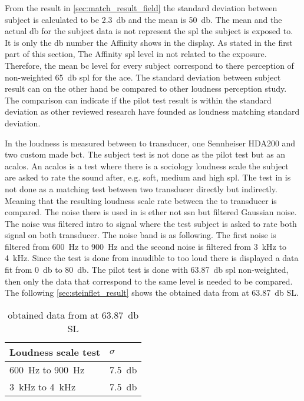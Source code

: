 From the result in \autoref{sec:match_result_field} the standard deviation between subject is calculated to be \SI{2.3}{\decibel} and the mean is \SI{50}{\decibel}. The mean and the actual \si{\decibel} for the subject data is not represent the \gls{spl} the subject is exposed to. It is only the \si{\decibel} number the Affinity shows in the display. As stated in the first part of this section, The Affinity  \gls{spl} level in not related to the exposure. Therefore, the mean \gls{bc} level for every subject correspond to there perception of non-weighted \SI{65}{\decibel} \gls{spl}  for the \gls{ace}. The standard deviation between subject result can on the other hand be compared to other loudness perception study. The comparison can indicate if the pilot test result is within the standard deviation as other reviewed research have founded as loudness matching standard deviation. 

In \citep{STENFELT201385} the loudness is measured between to transducer, one Sennheiser HDA200 and two custom made \gls{bct}. The subject test is not done as the pilot test but as an \gls{acalos}. An \gls{acalos} is a test where there is a sociology loudness scale the subject are asked to rate the sound after, e.g. soft, medium and high \gls{spl}. The test in \citep{STENFELT201385} is not done as a matching test between two transducer directly but indirectly. Meaning that the resulting loudness scale rate between the to transducer is compared. The noise there is used in \citep{STENFELT201385} is ether not \gls{ssn} but filtered Gaussian noise. The noise was filtered intro to signal where the test subject is asked to rate both signal on both transducer. The noise band is as following. The first noise is filtered from \SI{600}{\hertz} to \SI{900}{\hertz} and the second noise is filtered from \SI{3}{\kilo\hertz} to \SI{4}{\kilo\hertz}. Since the test is done from inaudible to too loud there is displayed a data fit from \SI{0}{\decibel} to \SI{80}{\decibel}. The pilot test is done with \SI{63.87}{\decibel} \gls{spl} non-weighted, then only the data that correspond to the same level is needed to be compared. The following \autoref{sec:steinflet_result} shows the obtained data from \citep{STENFELT201385} at \SI{63.87}{\decibel} SL.


\begin{table}[H]
\centering
\caption{obtained data from \citep{STENFELT201385} at \SI{63.87}{\decibel} SL}
\begin{tabular}{l|l}
Loudness scale test                        & $\sigma$            \\ \hline
\SI{600}{\hertz} to \SI{900}{\hertz}       & \SI{7.5}{\decibel} \\
\SI{3}{\kilo\hertz} to \SI{4}{\kilo\hertz} & \SI{7.5}{\decibel}
\end{tabular}
\label{sec:steinflet_result}
\end{table}

